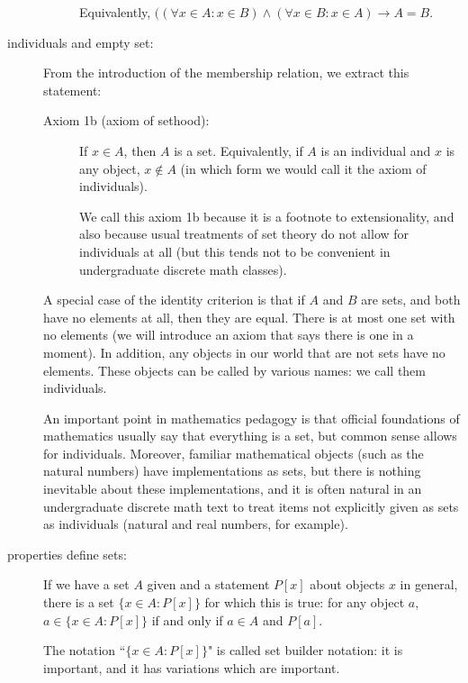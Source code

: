 \documentclass[12pt]{article}
\begin{document}
\begin{description}
\begin{description}
Equivalently, $((\forall x \in A: x\in B) \wedge (\forall x \in B:x \in A) \rightarrow A=B$.

\end{description}

\item[individuals and empty set:]   From the introduction of the membership relation, we extract this statement:  

\begin{description}
\item[Axiom 1b (axiom of sethood):]  If $x \in A$, then $A$ is a set.  Equivalently, if $A$ is an individual and $x$ is any object, $x \not\in A$ (in which form we would call it the axiom of individuals).

We call this axiom 1b because it is a footnote to extensionality, and also because usual treatments of set theory do not allow for individuals at all (but this tends not to be convenient in undergraduate discrete math classes).
\end{description}

A special case of the identity criterion is that if $A$ and $B$ are sets, and both have no elements at all, then they are equal.   There is at most one set with no elements (we will introduce an axiom that says there is one in a moment).  In addition, any objects in our world that are not sets have no elements.  These objects can be called by various names:  we call them individuals.

An important point in mathematics pedagogy is that official foundations of mathematics usually say that everything is a set,  but common sense allows for individuals.  Moreover, familiar mathematical objects (such as the natural numbers) have implementations as sets, but there is nothing inevitable about these implementations, and it is often natural in an undergraduate discrete math text to treat items not explicitly given as sets as individuals (natural and real numbers, for example).



\item[properties define sets:]  If we have a set $A$ given and a statement $P[x]$ about objects  $x$ in general, there is a set
$\{x \in A:P[x]\}$ for which this is true:  for any object $a$, $a \in \{x \in A:P[x]\}$ if and only if $a \in A$ and $P[a]$.

The notation ``$\{x \in A:P[x]\}$" is called set builder notation:  it is important, and it has variations which are important.


\end{description}
\end{document}

